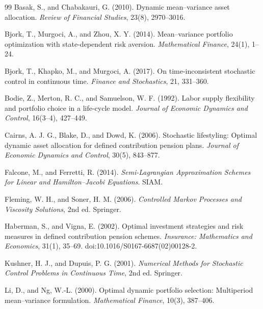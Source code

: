 \documentclass[11pt,a4paper]{article}
\numberwithin{equation}{section}
\numberwithin{table}{section}
\numberwithin{figure}{section}
\theoremstyle{plain}
\theoremstyle{definition}
\begin{document}
\begingroup\footnotesize\setlength{\bibsep}{1pt}\begin{thebibliography}{99}
Basak, S., and Chabakauri, G. (2010).
Dynamic mean--variance asset allocation.
\emph{Review of Financial Studies}, 23(8), 2970--3016.

Bjork, T., Murgoci, A., and Zhou, X. Y. (2014).
Mean--variance portfolio optimization with state-dependent risk aversion.
\emph{Mathematical Finance}, 24(1), 1--24.

Bjork, T., Khapko, M., and Murgoci, A. (2017).
On time-inconsistent stochastic control in continuous time.
\emph{Finance and Stochastics}, 21, 331--360.

Bodie, Z., Merton, R. C., and Samuelson, W. F. (1992).
Labor supply flexibility and portfolio choice in a life-cycle model.
\emph{Journal of Economic Dynamics and Control}, 16(3--4), 427--449.

Cairns, A. J. G., Blake, D., and Dowd, K. (2006).
Stochastic lifestyling: Optimal dynamic asset allocation for defined contribution pension plans.
\emph{Journal of Economic Dynamics and Control}, 30(5), 843--877.

Falcone, M., and Ferretti, R. (2014).
\emph{Semi-Lagrangian Approximation Schemes for Linear and Hamilton--Jacobi Equations}.
SIAM.

Fleming, W. H., and Soner, H. M. (2006).
\emph{Controlled Markov Processes and Viscosity Solutions}, 2nd ed.
Springer.

Haberman, S., and Vigna, E. (2002).
Optimal investment strategies and risk measures in defined contribution pension schemes.
\emph{Insurance: Mathematics and Economics}, 31(1), 35--69.
doi:10.1016/S0167-6687(02)00128-2.

Kushner, H. J., and Dupuis, P. G. (2001).
\emph{Numerical Methods for Stochastic Control Problems in Continuous Time}, 2nd ed.
Springer.

Li, D., and Ng, W.-L. (2000).
Optimal dynamic portfolio selection: Multiperiod mean--variance formulation.
\emph{Mathematical Finance}, 10(3), 387--406.


\end{thebibliography}
\end{document}
